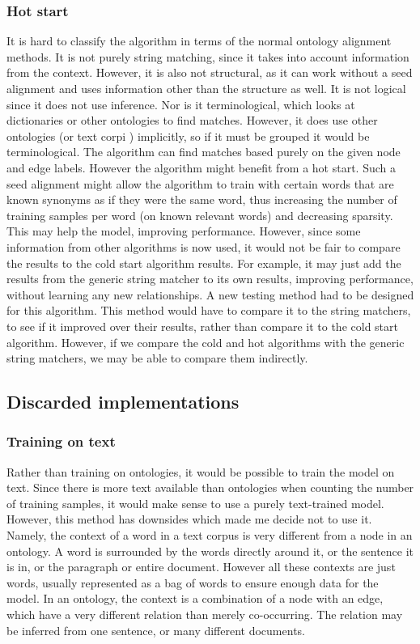 \documentclass{article}
\begin{document}
  \subsubsection{Hot start}
  It is hard to classify the algorithm in terms of the normal ontology alignment methods. It is not purely string matching, since it takes into account information from the context. However, it is also not structural, as it can work without a seed alignment and uses information other than the structure as well. It is not logical 
  since it does not use inference. Nor is it terminological, which looks at dictionaries or other ontologies to find matches. However, it does use other ontologies (or text corpi
  ) implicitly, so if it must be grouped it would be terminological.
  The algorithm can find matches based purely on the given node and edge labels. However the algorithm might benefit from a hot start. Such a seed alignment might allow the algorithm to train with certain words that are known synonyms as if they were the same word, thus increasing the number of training samples per word (on known relevant words) and decreasing sparsity. This may help the model, improving performance. However, since some information from other algorithms is now used, it would not be fair to compare the results to the cold start algorithm results. For example, it may just add the results from the generic string matcher to its own results, improving performance, without learning any new relationships. A new testing method had to be designed for this algorithm. This method would have to compare it to the string matchers, to see if it improved over their results, rather than compare it to the cold start algorithm. However, if we compare the cold and hot algorithms with the generic string matchers, we may be able to compare them indirectly. 
 \subsection{Discarded implementations}
  \subsubsection{Training on text}
  Rather than training on ontologies, it would be possible to train the model on text. Since there is more text available than ontologies when counting the number of training samples, it would make sense to use a purely text-trained model. However, this method has downsides which made me decide not to use it. Namely, the context of a word in a text corpus is very different from a node in an ontology. A word is surrounded by the words directly around it, or the sentence it is in, or the paragraph or entire document. However all these contexts are just words, usually represented as a bag of words to ensure enough data for the model. In an ontology, the context is a combination of a node with an edge, which have a very different relation than merely co-occurring. The relation may be inferred from one sentence, or many different documents.
\end{document}
